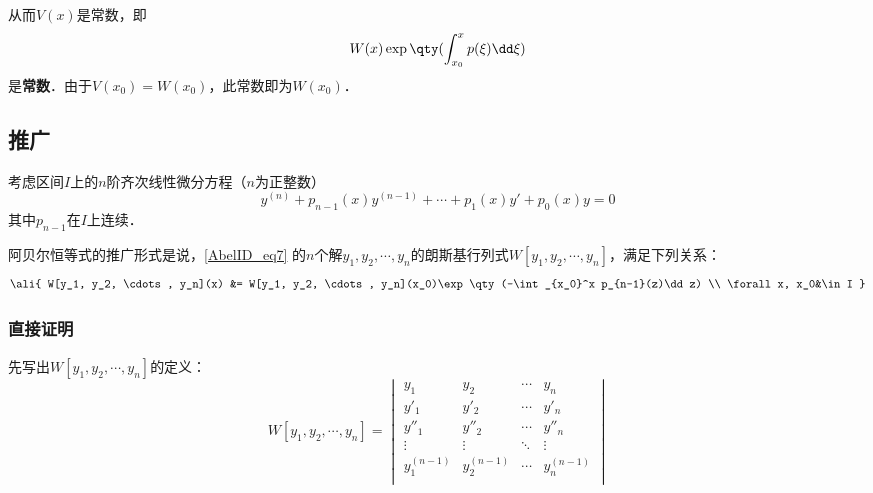 从而$V(x)$是常数，即
\begin{equation}
W(x)\exp\qty(\int_{x_0}^x p(\xi)\dd \xi)
\end{equation}
是\textbf{常数}．由于$V(x_0)=W(x_0)$，此常数即为$W(x_0)$．


\subsection{推广}

考虑区间$I$上的$n$阶齐次线性微分方程（$n$为正整数）
\begin{equation}\label{AbelID_eq7}
y^{(n)} + p_{n-1}(x)y^{(n-1)} + \cdots + p_1(x)y' + p_0(x)y = 0
\end{equation}
其中$p_{n-1}$在$I$上连续．

阿贝尔恒等式的推广形式是说，\autoref{AbelID_eq7} 的$n$个解$y_1, y_2, \cdots, y_n$的朗斯基行列式$W[y_1, y_2, \cdots, y_n]$，满足下列关系：
\begin{equation}
\ali{
W[y_1, y_2, \cdots, y_n](x) &= W[y_1, y_2, \cdots, y_n](x_0)\exp\qty(-\int_{x_0}^x p_{n-1}(z)\dd z) \\
\forall x, x_0&\in I
}
\end{equation}




\subsubsection{直接证明}

先写出$W[y_1, y_2, \cdots, y_n]$的定义：
\begin{equation}
W[y_1, y_2, \cdots, y_n] = 
\begin{vmatrix}
y_1&y_2&\cdots&y_n\\
y'_1&y'_2&\cdots&y'_n\\
y''_1&y''_2&\cdots&y''_n\\
\vdots&\vdots&\ddots&\vdots\\
y_1^{(n-1)}&y_2^{(n-1)}&\cdots&y_n^{(n-1)}\\
\end{vmatrix}
\end{equation}

